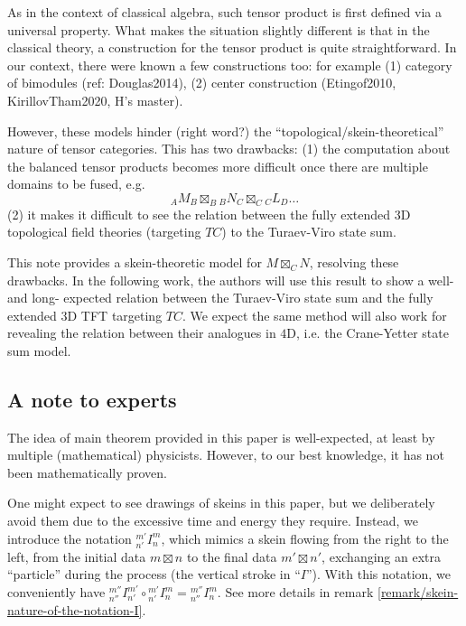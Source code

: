 As in the context of classical algebra, such tensor product is first defined
via a universal property. What makes the situation slightly different is that
in the classical theory, a construction for the tensor product is quite
straightforward. In our context, there were known a few constructions too: for
example (1) category of bimodules (ref: Douglas2014), (2) center construction
(Etingof2010, KirillovTham2020, H's master).

However, these models hinder (right word?) the
``topological/skein-theoretical'' nature of tensor categories. This has two drawbacks: (1) the computation about the balanced tensor products becomes more difficult once there are multiple domains to be fused, e.g.
\[ {}_{A}{M}_{B} \boxtimes_{B} {}_{B}{N}_{C} \boxtimes_{{C}} {}_{C}{L}_{D} \ldots
\]
(2) it makes it difficult to see the relation between the fully extended $3$D
topological field theories (targeting $TC$) to the Turaev-Viro state sum.

This note provides a skein-theoretic model for $M \boxtimes_{C} N$, resolving
these drawbacks. In the following work, the authors will use this result to
show a well- and long- expected relation between the Turaev-Viro state sum and
the fully extended $3$D TFT targeting $TC$. We expect the same method will
also work for revealing the relation between their analogues in $4$D, i.e. the
Crane-Yetter state sum model.

\subsection*{A note to experts}\label{subsection/a-note-to-experts}

The idea of main theorem provided in this paper is well-expected, at least by
multiple (mathematical) physicists. However, to our best knowledge, it has not
been mathematically proven.

One might expect to see drawings of skeins in this paper, but we deliberately
avoid them due to the excessive time and energy they require. Instead, we
introduce the notation ${}^{m'}_{n'}I^{m}_{n}$, which mimics a skein flowing
from the right to the left, from the initial data $m \boxtimes n$ to the final data
$m' \boxtimes n'$, exchanging an extra ``particle'' during the process (the vertical
stroke in ``$I$''). With this notation, we conveniently have
${}^{m''}_{n''}I^{m'}_{n'} \circ {}^{m'}_{n'}I^{m}_{n} = {}^{m''}_{n''}I^{m}_{n}$.
See more details in remark \ref{remark/skein-nature-of-the-notation-I}.

